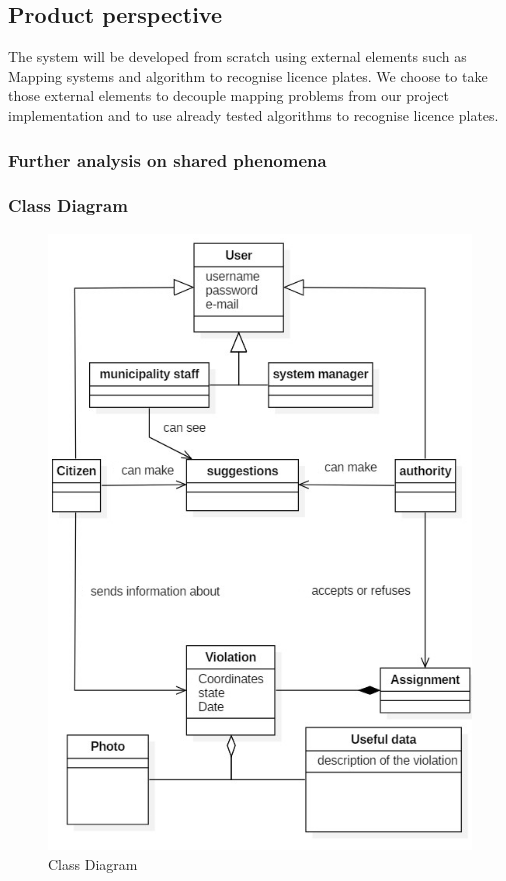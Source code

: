 \subsection{Product perspective}
The system will be developed from scratch using external elements such as Mapping systems and algorithm to recognise licence plates. We choose to take those external elements to decouple mapping problems from our project implementation and to use already tested algorithms to recognise licence plates.
\subsubsection{Further analysis on shared phenomena}
\subsubsection{Class Diagram}
\begin{figure}[h]
\centering
\includegraphics{Images/classdiagram.png}
\caption{\label{fig:cs} Class Diagram}
\end{figure}
\newpage
